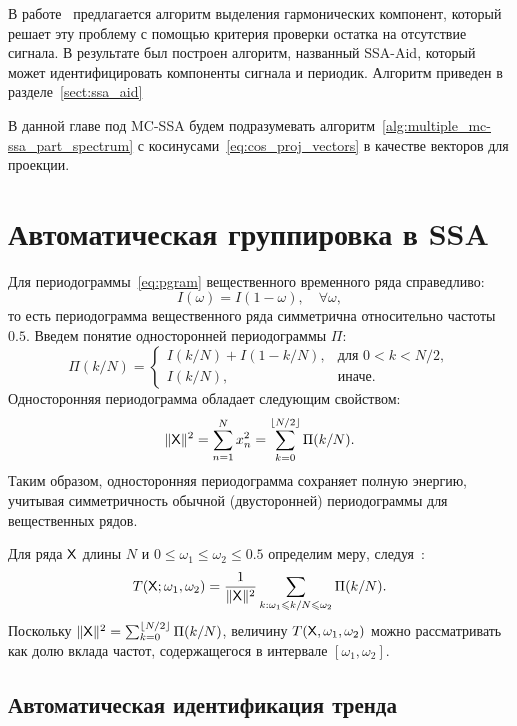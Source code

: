 \documentclass[specialist,
substylefile = spbu_report.rtx,
subf,12pt]{disser}
\theoremstyle{definition}
\begin{document}
В работе~\cite{Dudnik2025} предлагается алгоритм выделения гармонических компонент, который  решает эту проблему с помощью критерия проверки остатка на отсутствие сигнала. В результате был построен алгоритм, названный SSA-Aid, который может идентифицировать компоненты сигнала и периодик. Алгоритм приведен в разделе~\ref{sect:ssa_aid}

В данной главе под MC-SSA будем подразумевать алгоритм~\ref{alg:multiple_mc-ssa_part_spectrum} с косинусами~\eqref{eq:cos_proj_vectors} в качестве векторов для проекции.

\section{Автоматическая группировка в SSA}\label{sect:grouping_auto}

Для периодограммы~\eqref{eq:pgram} вещественного временного ряда справедливо:
\[
	I(\omega)=I(1-\omega), \quad \forall \omega,
\]
то есть периодограмма вещественного ряда симметрична относительно частоты $0.5$. Введем понятие односторонней периодограммы $\Pi$:
\begin{equation}\label{eq:pgram_corrected}
	\Pi(k / N)=
	\begin{cases}
		I(k / N) + I(1 - k / N), & \text{для } 0<k<N/2, \\
		I(k / N),                & \text{иначе}.
	\end{cases}
\end{equation}
Односторонняя периодограмма обладает следующим свойством:
\[
	\|\mathsf{X}\|^2=\sum_{n=1}^N x_n^2=\sum_{k=0}^{\lfloor N/2\rfloor} \Pi(k / N).
\]
Таким образом, односторонняя периодограмма сохраняет полную энергию, учитывая симметричность обычной (двусторонней) периодограммы для вещественных рядов.

Для ряда $\mathsf{X}$ длины $N$ и $0\leqslant\omega_1\leqslant\omega_2\leqslant0.5$ определим меру, следуя~\cite{AlexandrovGolyandina2004}:
\begin{equation}\label{eq:freq_measure}
	T(\mathsf{X};\omega_1,\omega_2)=\frac{1}{\|\mathsf{X}\|^2}\sum_{k:\omega_1\leqslant k/N\leqslant \omega_2}\Pi(k/N).
\end{equation}
Поскольку $\|\mathsf{X}\|^2=\sum_{k=0}^{\lfloor N/2\rfloor} \Pi(k / N)$, величину $T(\mathsf{X},\omega_1,\omega_2)$ можно рассматривать как долю вклада частот, содержащегося в интервале $[\omega_1,\omega_2]$.

\subsection{Автоматическая идентификация тренда}
\end{document}
